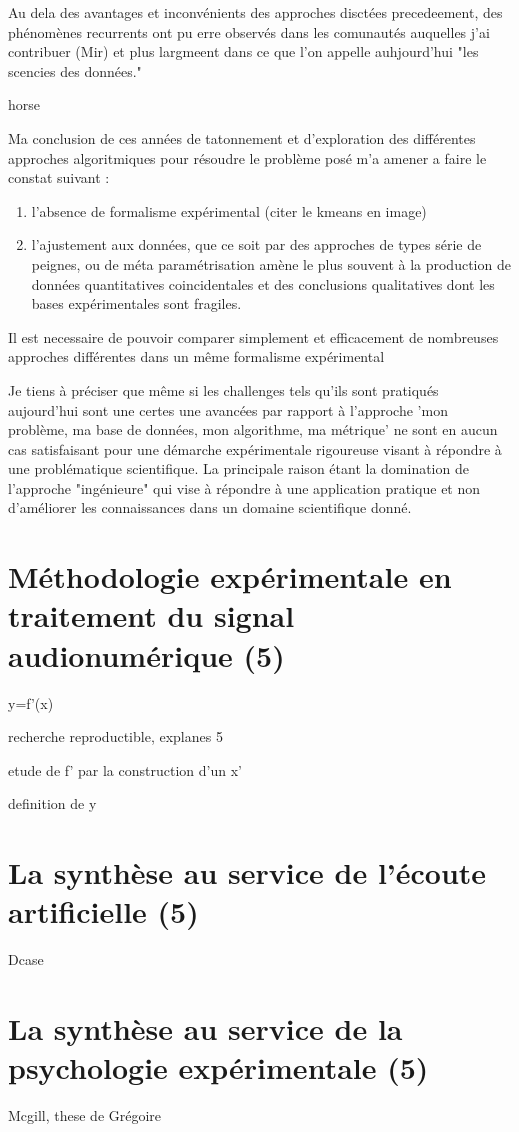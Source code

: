 Au dela des avantages et inconvénients des approches disctées precedeement, des phénomènes recurrents ont pu erre observés dans les comunautés auquelles j'ai contribuer (Mir) et plus largmeent dans ce que l'on appelle auhjourd'hui "les scencies des données."

horse

Ma conclusion de ces années de tatonnement et d'exploration des différentes approches algoritmiques pour résoudre le problème posé m'a amener a faire le constat suivant :
\begin{enumerate}
  \item l'absence de formalisme expérimental (citer le kmeans en image)
  \item l'ajustement aux données, que ce soit par des approches de types série de peignes, ou de méta paramétrisation amène le plus souvent à la production de données quantitatives coincidentales et des conclusions qualitatives dont les bases expérimentales sont fragiles.

\end{enumerate}

 Il est necessaire de pouvoir comparer simplement et efficacement de nombreuses approches différentes dans un même formalisme expérimental


Je tiens à préciser que même si les challenges tels qu'ils sont pratiqués aujourd'hui sont une certes une avancées par rapport à l'approche 'mon problème, ma base de données, mon algorithme, ma métrique' ne sont en aucun cas satisfaisant pour une démarche expérimentale rigoureuse visant à répondre à une problématique scientifique. La principale raison étant la domination de l'approche "ingénieure" qui vise à répondre à une application pratique et non d'améliorer les connaissances dans un domaine scientifique donné.

\section{Méthodologie expérimentale en traitement du signal audionumérique (5)}

y=f'(x)

recherche reproductible, explanes 5

etude de f' par la construction d'un x'

definition de y

\section{La synthèse au service de l'écoute artificielle (5)}

Dcase

\section{La synthèse au service de la psychologie expérimentale (5)}

Mcgill, these de Grégoire
